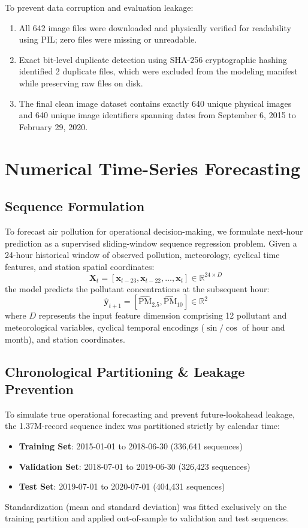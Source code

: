 \documentclass[conference]{IEEEtran}
\begin{document}
To prevent data corruption and evaluation leakage:
\begin{enumerate}
    \item All 642 image files were downloaded and physically verified for readability using PIL; zero files were missing or unreadable.
    \item Exact bit-level duplicate detection using SHA-256 cryptographic hashing identified 2 duplicate files, which were excluded from the modeling manifest while preserving raw files on disk.
    \item The final clean image dataset contains exactly 640 unique physical images and 640 unique image identifiers spanning dates from September 6, 2015 to February 29, 2020.
\end{enumerate}

\section{Numerical Time-Series Forecasting}

\subsection{Sequence Formulation}
To forecast air pollution for operational decision-making, we formulate next-hour prediction as a supervised sliding-window sequence regression problem. Given a 24-hour historical window of observed pollution, meteorology, cyclical time features, and station spatial coordinates:
\begin{equation}
\mathbf{X}_t = [\mathbf{x}_{t-23}, \mathbf{x}_{t-22}, \dots, \mathbf{x}_t] \in \mathbb{R}^{24 \times D}
\end{equation}
the model predicts the pollutant concentrations at the subsequent hour:
\begin{equation}
\hat{\mathbf{y}}_{t+1} = [\widehat{\text{PM}}_{2.5}, \widehat{\text{PM}}_{10}] \in \mathbb{R}^2
\end{equation}
where $D$ represents the input feature dimension comprising 12 pollutant and meteorological variables, cyclical temporal encodings ($\sin/\cos$ of hour and month), and station coordinates.

\subsection{Chronological Partitioning \& Leakage Prevention}
To simulate true operational forecasting and prevent future-lookahead leakage, the 1.37M-record sequence index was partitioned strictly by calendar time:
\begin{itemize}
    \item \textbf{Training Set}: 2015-01-01 to 2018-06-30 (336,641 sequences)
    \item \textbf{Validation Set}: 2018-07-01 to 2019-06-30 (326,423 sequences)
    \item \textbf{Test Set}: 2019-07-01 to 2020-07-01 (404,431 sequences)
\end{itemize}
Standardization (mean and standard deviation) was fitted exclusively on the training partition and applied out-of-sample to validation and test sequences.
\end{document}
